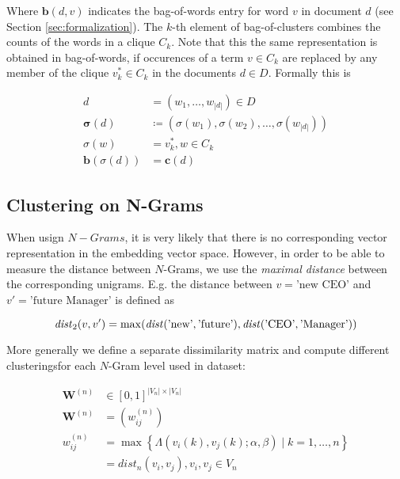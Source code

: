 Where $\mathbf{b}(d,v)$ indicates the bag-of-words entry for word $v$ in
document $d$ (see Section \ref{sec:formalization}). The $k$-th element of
bag-of-clusters combines the counts of the words in a clique $C_k$. Note that this
the same representation is obtained in bag-of-words, if occurences of a term $v \in C_k$ 
are replaced by any member of the clique $v_k^* \in C_k$ in the documents $d
\in D$. Formally this is

\begin{equation*}
\begin{split}
	d &= (w_1,\ldots,w_{|d|}) \in D \\
	\boldsymbol\sigma(d) &\coloneqq (\sigma(w_1),
	\sigma(w_2),\ldots,\sigma(w_{|d|}))
	\\
	\sigma(w) &= v_k^*, w \in C_k \\ 
	\mathbf{b}(\sigma(d)) &= \mathbf{c}(d)
\end{split}
\end{equation*}

\subsection{Clustering on N-Grams}

When usign $N-Grams$, it is very likely that there is no
corresponding vector representation in the embedding vector space. However, in
order to be able to measure the distance between $N$-Grams, we use the
\emph{maximal distance} between the corresponding unigrams. E.g. the distance
between $v=\text{'new CEO'}$ and $v'=\text{'future Manager'}$ is defined
as

\begin{equation*}
	\mathit{dist}_2(v,v') = \max(\mathit{dist}(\text{'new'}, \text{{'future'}}),
	\mathit{dist}(\text{'CEO'}, \text{'Manager')})
\end{equation*}

More generally we define a separate dissimilarity matrix and compute
different clusteringsfor each $N$-Gram level used in dataset:

\begin{equation*}
\begin{split}
	\mathbf{W}^{(n)} &\in [0,1]^{|V_n|\times|V_n|} \\
	\mathbf{W}^{(n)} &= \left(w^{(n)}_{ij}\right) \\
	w^{(n)}_{ij} &= \max\left\{ \Lambda\left(v_i(k), v_j(k); \alpha,
	\beta\right) \mid k = 1,\ldots,n\right\} \\
	&= dist_n(v_i,v_j), v_i, v_j \in V_n
\end{split}
\end{equation*}

